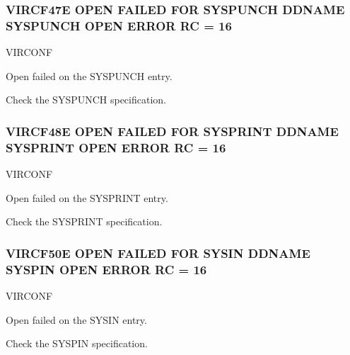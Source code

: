 \documentclass[letterpaper,10pt,english]{sphinxmanual}
\begin{document}
\subsubsection{VIRCF47E OPEN FAILED FOR SYSPUNCH DDNAME SYSPUNCH OPEN ERROR \sphinxhyphen{} RC = 16}
\label{\detokenize{messages:vircf47e-open-failed-for-syspunch-ddname-syspunch-open-error-rc-16}}\begin{description}
\sphinxAtStartPar
VIRCONF

\sphinxAtStartPar
Open failed on the SYSPUNCH entry.

\sphinxAtStartPar
Check the SYSPUNCH specification.

\end{description}


\subsubsection{VIRCF48E OPEN FAILED FOR SYSPRINT DDNAME SYSPRINT OPEN ERROR \sphinxhyphen{} RC = 16}
\label{\detokenize{messages:vircf48e-open-failed-for-sysprint-ddname-sysprint-open-error-rc-16}}\begin{description}
\sphinxAtStartPar
VIRCONF

\sphinxAtStartPar
Open failed on the SYSPRINT entry.

\sphinxAtStartPar
Check the SYSPRINT specification.

\end{description}


\subsubsection{VIRCF50E OPEN FAILED FOR SYSIN DDNAME SYSPIN OPEN ERROR \sphinxhyphen{} RC = 16}
\label{\detokenize{messages:vircf50e-open-failed-for-sysin-ddname-syspin-open-error-rc-16}}\begin{description}
\sphinxAtStartPar
VIRCONF

\sphinxAtStartPar
Open failed on the SYSIN entry.

\sphinxAtStartPar
Check the SYSPIN specification.

\end{description}
\end{document}
